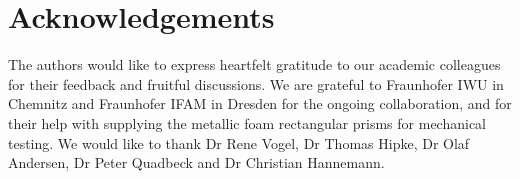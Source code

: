 \documentclass[review]{elsarticle}
\begin{document}
{%









\printnomenclature[1.5cm]

\section*{Acknowledgements}

The authors would like to express heartfelt gratitude to our academic colleagues for their feedback and fruitful discussions. We are grateful to Fraunhofer IWU in Chemnitz and Fraunhofer IFAM in Dresden for the ongoing collaboration, and for their help with supplying the metallic foam rectangular prisms for mechanical testing. We would like to thank Dr Rene Vogel, Dr Thomas Hipke, Dr Olaf Andersen, Dr Peter Quadbeck and Dr Christian Hannemann.

}
\end{document}
